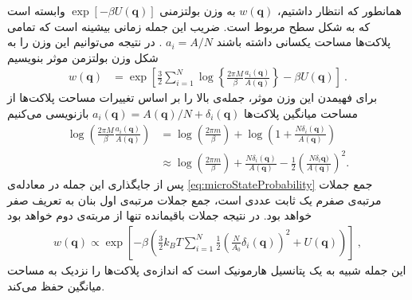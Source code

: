 همانطور که انتظار داشتیم،
$w(\bm q)$ 
به وزن بولتزمنی 
$\exp\left[-\beta U(\bm q)\right]$
وابسته است که به شکل سطح مربوط است. ضریب این جمله زمانی بیشینه است که تمامی پلاکت‌ها مساحت یکسانی داشته باشند
$a_i = A/N$
. در نتیجه می‌توانیم این وزن را به شکل وزن بولتزمن موثر بنویسیم
\begin{equation}
\begin{aligned}
w(\bm q)
&=\exp\left[\frac{3}{2}\sum_{i=1}^N\log\left\{\frac{2\pi M}{\beta} \frac{a_i(\bm q)}{A(\bm q)}\right\}-\beta U(\bm q)\right]\ .
\end{aligned}
\label{eq:microStateProbability}
\end{equation}
برای فهیمدن این وزن موثر، جمله‌ی بالا را بر اساس تغییرات مساحت پلاکت‌ها از مساحت میانگین پلاکت‌ها 
$a_i(\bm q)=A(\bm q)/N+\delta_i(\bm q)$
بازنویسی می‌کنیم
\begin{equation*}
\begin{aligned}
\log\left(\frac{2\pi M}{\beta} \frac{a_i(\bm q)}{A(\bm q)}\right)
&=\log\left(\frac{2\pi m}{\beta}\right)+\log\left(1+\frac{N\delta_i(\bm q)}{A(\bm q)}\right)\\
&\approx\log\left(\frac{2\pi m}{\beta}\right)+\frac{N\delta_i(\bm q)}{A(\bm q)}-\frac{1}{2}\left(\frac{N\delta_i\bm q)}{A(\bm q)}\right)^2.
\end{aligned}
\label{eq:logExpantion}
\end{equation*}
پس از جایگذاری این جمله در معادله‌ی 
\ref{eq:microStateProbability}
جمع جملات مرتبه‌ی صفرم یک ثابت عددی است، جمع جملات مرتبه‌ی اول بنان به تعریف صفر خواهد بود. در نتیجه جملات باقیمانده تنها از مربته‌ی دوم خواهد بود
\begin{equation}
\begin{aligned}
w(\bm q)\propto\exp\left[-\beta\left( \frac{3}{2}k_BT\sum_{i=1}^N \frac{1}{2}(\frac{N}{A_0}\delta_i(\bm q))^2+U(\bm q)\right)\right] \ ,
\end{aligned}
\label{eq:microStateProbabilityExpansion}
\end{equation}
این جمله شبیه به یک پتانسیل هارمونیک است که اندازه‌ی پلاکت‌ها را نزدیک به مساحت میانگین حفظ می‌کند.



